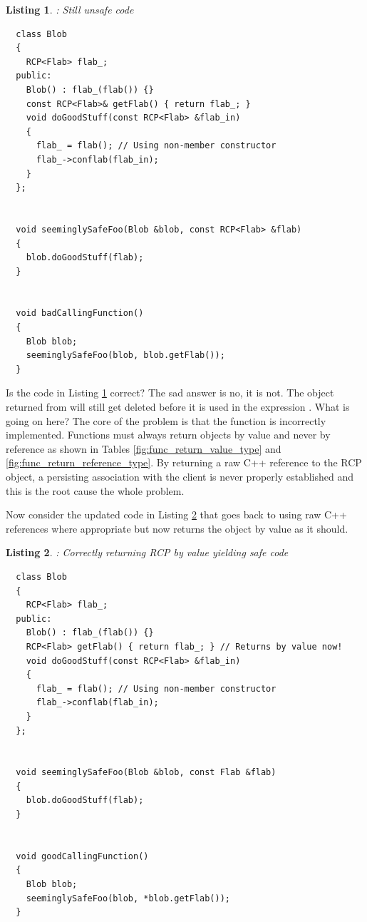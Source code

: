 \documentclass[pdf,ps2pdf,11pt]{SANDreport}
\newtheorem{listing}{Listing}
\begin{document}
\begin{listing}: Still unsafe code  \\
\label{listing:unsafe_raw_C++_reference3}
{\small\begin{verbatim}
  class Blob
  {
    RCP<Flab> flab_;
  public:
    Blob() : flab_(flab()) {}
    const RCP<Flab>& getFlab() { return flab_; }
    void doGoodStuff(const RCP<Flab> &flab_in)
    {
      flab_ = flab(); // Using non-member constructor
      flab_->conflab(flab_in);
    }
  };


  void seeminglySafeFoo(Blob &blob, const RCP<Flab> &flab)
  {
    blob.doGoodStuff(flab);
  }


  void badCallingFunction()
  {
    Blob blob;
    seeminglySafeFoo(blob, blob.getFlab());
  }
\end{verbatim}}
\end{listing}

Is the code in Listing {}\ref{listing:unsafe_raw_C++_reference3}
correct?  The sad answer is no, it is not.  The {} object
returned from {} will still get deleted before
it is used in the expression {}.
What is going on here?  The core of the problem is that the function
{} is incorrectly implemented.  Functions must
always return {} objects by value and never by reference
as shown in Tables {}\ref{fig:func_return_value_type} and
{}\ref{fig:func_return_reference_type}.  By returning a raw C++
reference to the RCP object, a persisting association with the client
is never properly established and this is the root cause the whole
problem.

Now consider the updated code in Listing
{}\ref{listing:safe_raw_C++_reference3} that goes back to using raw
C++ references where appropriate but now returns the
{} object by value as it should.

\begin{listing}: Correctly returning RCP by value yielding safe code \\
\label{listing:safe_raw_C++_reference3}
{\small\begin{verbatim}
  class Blob
  {
    RCP<Flab> flab_;
  public:
    Blob() : flab_(flab()) {}
    RCP<Flab> getFlab() { return flab_; } // Returns by value now!
    void doGoodStuff(const RCP<Flab> &flab_in)
    {
      flab_ = flab(); // Using non-member constructor
      flab_->conflab(flab_in);
    }
  };


  void seeminglySafeFoo(Blob &blob, const Flab &flab)
  {
    blob.doGoodStuff(flab);
  }


  void goodCallingFunction()
  {
    Blob blob;
    seeminglySafeFoo(blob, *blob.getFlab());
  }
\end{verbatim}}
\end{listing}
\end{document}
